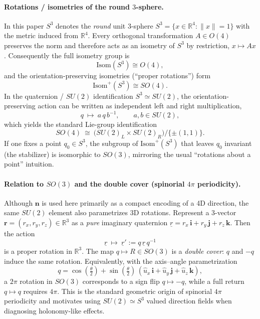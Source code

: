 \paragraph{Rotations / isometries of the round $3$-sphere.}
In this paper $S^3$ denotes the \emph{round} unit $3$-sphere
$S^3=\{x\in\mathbb R^4:\|x\|=1\}$ with the metric induced from $\mathbb R^4$.
Every orthogonal transformation $A\in O(4)$ preserves the norm and therefore acts
as an isometry of $S^3$ by restriction, $x\mapsto Ax$.
Consequently the full isometry group is
\begin{equation}
  \mathrm{Isom}(S^3)\cong O(4),
  \label{eq:isom-s3-o4}
\end{equation}
and the orientation-preserving isometries (``proper rotations'') form
\begin{equation}
  \mathrm{Isom}^+(S^3)\cong SO(4).
  \label{eq:isomplus-s3-so4}
\end{equation}
In the quaternion / $SU(2)$ identification $S^3\simeq SU(2)$, the
orientation-preserving action can be written as independent left and right
multiplication,
\begin{equation}
  q \ \mapsto\ a\,q\,b^{-1},
  \qquad a,b\in SU(2),
  \label{eq:left-right-action}
\end{equation}
which yields the standard Lie-group identification
\begin{equation}
  SO(4)\ \cong\ \bigl(SU(2)_L\times SU(2)_R\bigr)\big/\{\pm(1,1)\}.
  \label{eq:so4-su2xsu2}
\end{equation}
If one fixes a point $q_0\in S^3$, the subgroup of $\mathrm{Isom}^+(S^3)$ that
leaves $q_0$ invariant (the stabilizer) is isomorphic to $SO(3)$, mirroring the
usual ``rotations about a point'' intuition.

\paragraph{Relation to $SO(3)$ and the double cover (spinorial $4\pi$ periodicity).}
Although $\mathbf n$ is used here primarily as a compact encoding of a 4D
direction, the same $SU(2)$ element also parametrizes 3D rotations.
Represent a 3-vector $\mathbf r=(r_x,r_y,r_z)\in\mathbb R^3$ as a \emph{pure}
imaginary quaternion $\underline r=r_x\,\mathbf i+r_y\,\mathbf j+r_z\,\mathbf k$.
Then the action
\begin{equation}
  \underline r \ \mapsto\ \underline r' := q\,\underline r\,q^{-1}
  \label{eq:su2-rotation-action}
\end{equation}
is a proper rotation in $\mathbb R^3$. The map $q\mapsto R\in SO(3)$ is a
\emph{double cover}: $q$ and $-q$ induce the same rotation. Equivalently, with
the axis--angle parametrization
\begin{equation}
  q = \cos(\tfrac{\theta}{2}) + \sin(\tfrac{\theta}{2})\,
  (\hat u_x\,\mathbf i+\hat u_y\,\mathbf j+\hat u_z\,\mathbf k),
  \label{eq:axis-angle-quaternion}
\end{equation}
a $2\pi$ rotation in $SO(3)$ corresponds to a sign flip $q\mapsto -q$, while a
full return $q\mapsto q$ requires $4\pi$. This is the standard geometric origin
of spinorial $4\pi$ periodicity and motivates using $SU(2)\simeq S^3$ valued
direction fields when diagnosing holonomy-like effects.

